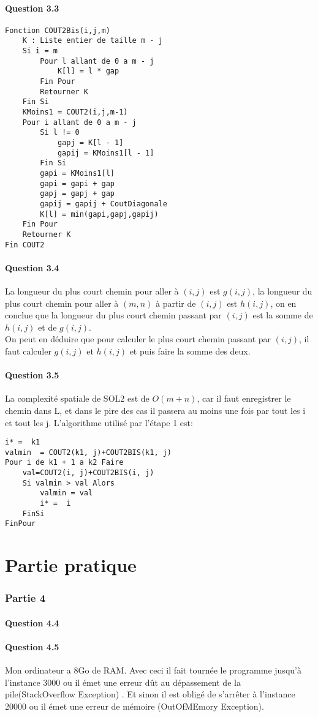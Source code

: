 \documentclass[5pt,a4paper]{report}
\begin{document}
	\subsection*{Question 3.3}
	\begin{lstlisting}
Fonction COUT2Bis(i,j,m)
	K : Liste entier de taille m - j
	Si i = m
		Pour l allant de 0 a m - j
			K[l] = l * gap
		Fin Pour
		Retourner K
	Fin Si
	KMoins1 = COUT2(i,j,m-1)
	Pour i allant de 0 a m - j
		Si l != 0
			gapj = K[l - 1]
			gapij = KMoins1[l - 1]
		Fin Si
		gapi = KMoins1[l]
		gapi = gapi + gap
		gapj = gapj + gap
		gapij = gapij + CoutDiagonale
		K[l] = min(gapi,gapj,gapij)
	Fin Pour
	Retourner K
Fin COUT2
	\end{lstlisting}
	
	\subsection*{Question 3.4}
	La longueur du plus court chemin pour aller à $(i,j)$ est $g(i,j)$, la longueur du plus court chemin pour aller à $(m,n)$ à partir de $(i,j)$ est $h(i,j)$, on en conclue que la longueur du plus court chemin passant par $(i,j)$ est la somme de $h(i,j)$ et de $g(i,j)$.\\
	On peut en déduire que pour calculer le plus court chemin passant par $(i,j)$, il faut calculer $g(i,j)$ et $h(i,j)$ et puis faire la somme des deux.
	
	\subsection*{Question 3.5}
	La complexité spatiale de SOL2 est de $O(m+n)$, car il faut enregistrer le chemin dans L, et dans le pire des cas il passera au moins une fois par tout les i et tout les j.
	L'algorithme utilisé par l'étape 1 est:
	\begin{lstlisting}
i* =  k1
valmin  = COUT2(k1, j)+COUT2BIS(k1, j)
Pour i de k1 + 1 a k2 Faire
	val=COUT2(i, j)+COUT2BIS(i, j)
	Si valmin > val Alors
		valmin = val
		i* =  i
	FinSi
FinPour
	\end{lstlisting}
\part{Partie pratique}

\section*{Partie 4}
\subsection*{Question 4.4}
\subsection*{Question 4.5}
Mon ordinateur a 8Go de RAM. Avec ceci il fait tournée le programme jusqu'à l'instance 3000 ou il émet une erreur dût au dépassement de la pile(StackOverflow Exception) . Et sinon il est obligé de s'arrêter à l'instance 20000 ou il émet une erreur de mémoire (OutOfMEmory Exception).
\end{document}
